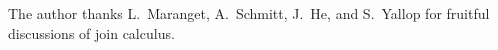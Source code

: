 \documentclass[sigplan,10pt]{acmart}\settopmatter{}
\begin{document}
\begin{acks}                            %
  The author thanks L.~Maranget, A.~Schmitt, J.~He, and S.~Yallop for fruitful discussions of join calculus.
\end{acks}






\end{document}
